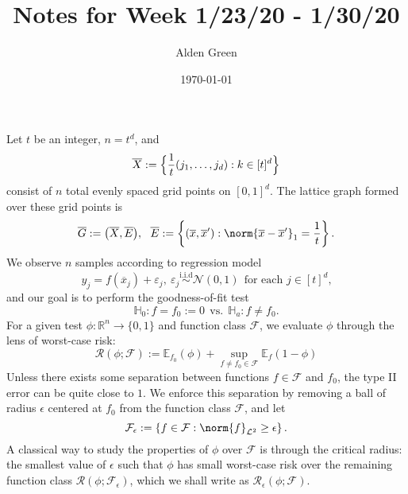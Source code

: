 \documentclass{article}
\newcommand{\Reals}{\mathbb{R}}
\newcommand{\set}[1]{\left\{#1\right\}}
\newcommand{\1}{\mathbf{1}}
\newcommand{\Leb}{\mathcal{L}}
\newcommand{\Ebb}{\mathbb{E}}
\newcommand{\ol}[1]{\overline{#1}}
\theoremstyle{alden}
\theoremstyle{aldenthm}
\theoremstyle{definition}
\theoremstyle{remark}
\begin{document}
\title{Notes for Week 1/23/20 - 1/30/20}
\author{Alden Green}
\date{\today}
\maketitle

Let $t$ be an integer, $n = t^d$, and 
\begin{equation*}
\overline{X} := \Bigl\{\frac{1}{t}(j_1,\ldots,j_d): k \in [t]^d\Bigr\}
\end{equation*}
consist of $n$ total evenly spaced grid points on $[0,1]^d$. The lattice graph formed over these grid points is 
\begin{equation*}
\overline{G} := \bigl(\overline{X},\overline{E}\bigr),~~ \overline{E} := \set{(\overline{x},\overline{x}'): \norm{\overline{x} - \overline{x}'}_1 = \frac{1}{t}}.
\end{equation*}
We observe $n$ samples according to regression model
\begin{equation}
\label{eqn:grid_regression_model}
y_j = f(\ol{x}_j) + \varepsilon_j, ~\varepsilon_j \overset{\mathrm{i.i.d}}{\sim} \mathcal{N}(0,1) ~~\textrm{for each $j \in [t]^d$,}
\end{equation}
and our goal is to perform the goodness-of-fit test
\begin{equation*}
\mathbb{H}_0 : f = f_0 := 0 ~~\textrm{vs.}~~ \mathbb{H}_a: f \neq f_0.
\end{equation*}
For a given test $\phi:\Reals^n \to \{0,1\}$ and function class $\mathcal{F}$, we evaluate $\phi$ through the lens of worst-case risk:
\begin{equation*}
\mathcal{R}(\phi; \mathcal{F}) := \Ebb_{f_0}(\phi) + \sup_{f \neq f_0 \in \mathcal{F}}\Ebb_{f}(1 - \phi)
\end{equation*}
Unless there exists some separation between functions $f \in \mathcal{F}$ and $f_0$, the type II error can be quite close to $1$. We enforce this separation by removing a ball of radius $\epsilon$ centered at $f_0$ from the function class $\mathcal{F}$, and let
\begin{equation*}
\mathcal{F}_{\epsilon} := \set{f \in \mathcal{F}: \norm{f}_{\Leb^2} \geq \epsilon}.
\end{equation*}
A classical way to study the properties of $\phi$ over $\mathcal{F}$ is through the critical radius: the smallest value of $\epsilon$ such that $\phi$ has small worst-case risk over the remaining function class $\mathcal{R}(\phi;\mathcal{F}_{\epsilon})$, which we shall write as $\mathcal{R}_{\epsilon}(\phi;\mathcal{F})$.  
\end{document}
